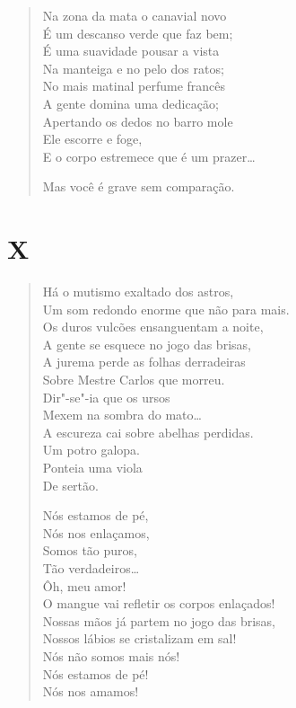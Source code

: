 \begin{verse}
Na zona da mata o canavial novo\\
É um descanso verde que faz bem;\\
É uma suavidade pousar a vista\\
Na manteiga e no pelo dos ratos;\\
No mais matinal perfume francês\\
A gente domina uma dedicação;\\
Apertando os dedos no barro mole\\
Ele escorre e foge,\\
E o corpo estremece que é um prazer\ldots{}

Mas você é grave sem comparação.
\end{verse}

\pagebreak
\section*{X}

\begin{verse}
Há o mutismo exaltado dos astros,\\
Um som redondo enorme que não para mais.\\
Os duros vulcões ensanguentam a noite,\\
A gente se esquece no jogo das brisas,\\
A jurema perde as folhas derradeiras\\
Sobre Mestre Carlos que morreu.\\
Dir"-se"-ia que os ursos\\
Mexem na sombra do mato\ldots{}\\
A escureza cai sobre abelhas perdidas.\\
Um potro galopa.\\
Ponteia uma viola\\
De sertão.

Nós estamos de pé,\\
Nós nos enlaçamos,\\
Somos tão puros,\\
Tão verdadeiros\ldots{}\\
Ôh, meu amor!\\
O mangue vai refletir os corpos enlaçados!\\
Nossas mãos já partem no jogo das brisas,\\
Nossos lábios se cristalizam em sal!\\
Nós não somos mais nós!\\
Nós estamos de pé!\\
Nós nos amamos!
\end{verse}


